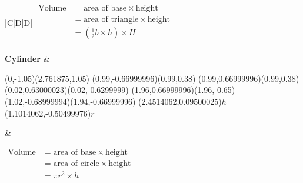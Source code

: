 \begin{table*}[h]
\begin{tabular}{|C|D|D|}
$\begin{aligned}
\mbox{Volume} &= \mbox{area of base} \times \mbox{height} \\
                &= \mbox{area of triangle} \times \mbox{height} \\
                &=(\frac{1}{2}b\times h) \times H \\
\end{aligned}$  \\ \hline

\textbf{Cylinder} &
\begin{center}
\scalebox{1} %
{
\begin{pspicture}(0,-1.05)(2.761875,1.05)
\psellipse[linewidth=0.04,dimen=outer](0.99,-0.66999996)(0.99,0.38)
\psellipse[linewidth=0.04,dimen=outer](0.99,0.66999996)(0.99,0.38)
\psline[linewidth=0.04cm](0.02,0.63000023)(0.02,-0.6299999)
\psline[linewidth=0.04cm](1.96,0.66999996)(1.96,-0.65)
\psline[linewidth=0.04cm,linestyle=dashed,dash=0.16cm 0.16cm](1.02,-0.68999994)(1.94,-0.66999996)
\rput(2.4514062,0.09500025){$h$}
\rput(1.1014062,-0.50499976){$r$}
\end{pspicture} 
}
\end{center}
&

$\begin{aligned}
\mbox{Volume} &= \mbox{area of base} \times \mbox{height} \\
                &= \mbox{area of circle} \times \mbox{height} \\
                &= \pi r^2 \times h \\
\end{aligned}$  \\ \hline



\end{tabular}
\end{table*}






